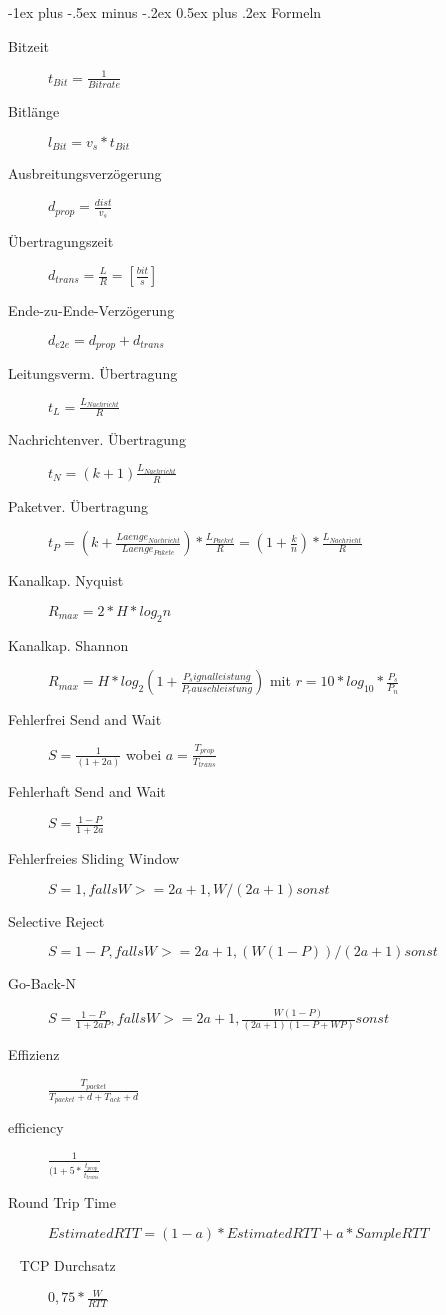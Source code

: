 \documentclass[10pt,landscape]{article}
\makeatletter
\renewcommand{\section}{\@startsection{section}{1}{0mm}%
                                {-1ex plus -.5ex minus -.2ex}%
                                {0.5ex plus .2ex}%
                                {\normalfont\large\bfseries}}
\makeatother
\begin{document}
\begin{multicols}{3}
\end{multicols}

\section{Formeln}
\begin{multicols}{2}
    \begin{description}
        \item[Bitzeit] $t_{Bit}=\frac{1}{Bitrate}$
        \item[Bitlänge] $l_{Bit}=v_s * t_{Bit}$
        \item[Ausbreitungsverzögerung]  $d_{prop} = \frac{dist}{v_s}$
        \item[Übertragungszeit] $d_{trans} = \frac{L}{R} = [\frac{bit}{s}]$
        \item[Ende-zu-Ende-Verzögerung] $d_{e2e} = d_{prop} + d_{trans}$
        \item[Leitungsverm. Übertragung] $t_L = \frac{L_{Nachricht}}{R}$
        \item[Nachrichtenver. Übertragung] $t_N = (k + 1)\frac{L_{Nachricht}}{R}$
        \item[Paketver. Übertragung] $t_{P} = (k + \frac{Laenge_{Nachricht}}{Laenge_{Pakete}})*\frac{L_{Packet}}{R} = (1+ \frac{k}{n})* \frac{L_{Nachricht}}{R}$
        \item[Kanalkap. Nyquist] $R_{max} = 2* H * log_2n$
        \item[Kanalkap. Shannon] $R_{max} = H*log_2(1+\frac{P_signalleistung}{P_rauschleistung})$ mit $r=10*log_{10}*{\frac{P_s}{P_n}}$
        \item[Fehlerfrei Send and Wait] $S = \frac{1}{(1+2a)}$ wobei $a = \frac{T_{prop}}{T_{trans}}$
        \item[Fehlerhaft Send and Wait] $S = \frac{1-P}{1+2a}$
        \item[Fehlerfreies Sliding Window] $S = {1, falls W >= 2a+1, W/(2a+1) sonst}$
        \item[Selective Reject] $S = {1-P, falls W >= 2a+1, (W(1-P))/(2a+1) sonst}$
        \item[Go-Back-N] $S = {\frac{1-P}{1+2aP}, falls W >= 2a+1, \frac{W(1-P)}{(2a+1)(1-P+WP)} sonst}$
        \item[Effizienz] $\frac{T_{packet} }{ T_{packet} + d + T_{ack} + d}$
        \item[efficiency] $\frac{1}{ (1+ 5 * \frac{t_{prop}}{t_{trans}}}$
        \item[Round Trip Time] $EstimatedRTT = (1-a) * EstimatedRTT + a * SampleRTT$
        \item[~ TCP Durchsatz] $ 0,75 * \frac{W}{RTT}$
    \end{description}
\end{multicols}
\end{document}
